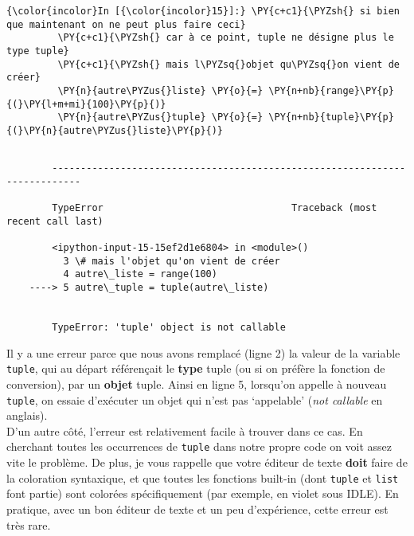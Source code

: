     \begin{Verbatim}[commandchars=\\\{\}]
{\color{incolor}In [{\color{incolor}15}]:} \PY{c+c1}{\PYZsh{} si bien que maintenant on ne peut plus faire ceci}
         \PY{c+c1}{\PYZsh{} car à ce point, tuple ne désigne plus le type tuple}
         \PY{c+c1}{\PYZsh{} mais l\PYZsq{}objet qu\PYZsq{}on vient de créer}
         \PY{n}{autre\PYZus{}liste} \PY{o}{=} \PY{n+nb}{range}\PY{p}{(}\PY{l+m+mi}{100}\PY{p}{)}
         \PY{n}{autre\PYZus{}tuple} \PY{o}{=} \PY{n+nb}{tuple}\PY{p}{(}\PY{n}{autre\PYZus{}liste}\PY{p}{)}
\end{Verbatim}


    \begin{Verbatim}[commandchars=\\\{\}]

        ---------------------------------------------------------------------------

        TypeError                                 Traceback (most recent call last)

        <ipython-input-15-15ef2d1e6804> in <module>()
          3 \# mais l'objet qu'on vient de créer
          4 autre\_liste = range(100)
    ----> 5 autre\_tuple = tuple(autre\_liste)
    

        TypeError: 'tuple' object is not callable

    \end{Verbatim}

    Il y a une erreur parce que nous avons remplacé (ligne 2) la valeur de
la variable \texttt{tuple}, qui au départ référençait le \textbf{type}
tuple (ou si on préfère la fonction de conversion), par un
\textbf{objet} tuple. Ainsi en ligne 5, lorsqu'on appelle à nouveau
\texttt{tuple}, on essaie d'exécuter un objet qui n'est pas `appelable'
(\emph{not callable} en anglais).\\

D'un autre côté, l'erreur est relativement facile à trouver dans ce cas.
En cherchant toutes les occurrences de \texttt{tuple} dans notre propre
code on voit assez vite le problème. De plus, je vous rappelle que votre
éditeur de texte \textbf{doit} faire de la coloration syntaxique, et que
toutes les fonctions built-in (dont \texttt{tuple} et \texttt{list} font
partie) sont colorées spécifiquement (par exemple, en violet sous IDLE).
En pratique, avec un bon éditeur de texte et un peu d'expérience, cette
erreur est très rare.